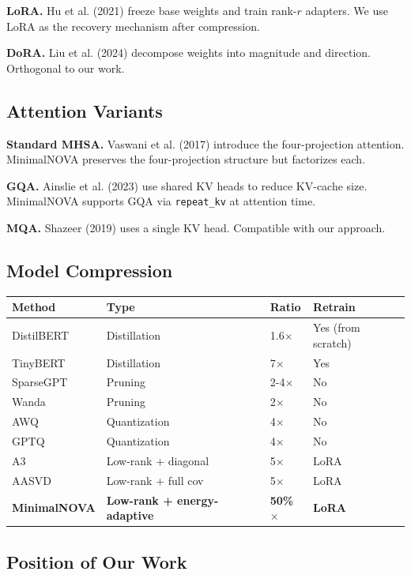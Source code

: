 \textbf{LoRA.} Hu et al. (2021) freeze base weights and train rank-$r$ adapters. 
We use LoRA as the recovery mechanism after compression.

\textbf{DoRA.} Liu et al. (2024) decompose weights into magnitude and direction. 
Orthogonal to our work.

\subsection{Attention Variants}

\textbf{Standard MHSA.} Vaswani et al. (2017) introduce the four-projection 
attention. MinimalNOVA preserves the four-projection structure but factorizes 
each.

\textbf{GQA.} Ainslie et al. (2023) use shared KV heads to reduce KV-cache size. 
MinimalNOVA supports GQA via \texttt{repeat\_kv} at attention time.

\textbf{MQA.} Shazeer (2019) uses a single KV head. Compatible with our approach.

\subsection{Model Compression}

\begin{table}[H]
\centering
\small
\begin{tabular}{llll}
\toprule
\textbf{Method} & \textbf{Type} & \textbf{Ratio} & \textbf{Retrain} \\
\midrule
DistilBERT & Distillation & 1.6$\times$ & Yes (from scratch) \\
TinyBERT & Distillation & 7$\times$ & Yes \\
SparseGPT & Pruning & 2-4$\times$ & No \\
Wanda & Pruning & 2$\times$ & No \\
AWQ & Quantization & 4$\times$ & No \\
GPTQ & Quantization & 4$\times$ & No \\
A3 & Low-rank + diagonal & 5$\times$ & LoRA \\
AASVD & Low-rank + full cov & 5$\times$ & LoRA \\
\textbf{MinimalNOVA} & \textbf{Low-rank + energy-adaptive} & \textbf{50\%$\times$} & \textbf{LoRA} \\
\bottomrule
\end{tabular}
\end{table}

\subsection{Position of Our Work}

